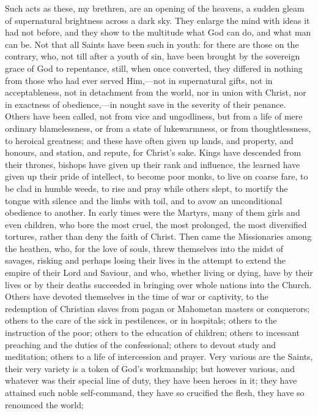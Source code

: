 Such acts as these, my brethren, are an opening of the heavens, a
sudden gleam of supernatural brightness across a dark sky. They
enlarge the mind with ideas it had not before, and they show to the
multitude what God can do, and what man can be. Not that all Saints
have been such in youth: for there are those on the contrary, who, not
till after a youth of sin, have been brought by the sovereign grace of
God to repentance, still, when once converted, they differed in
nothing from those who had ever served Him,—not in supernatural
gifts, not in acceptableness, not in detachment from the world, nor in
union with Christ, nor in exactness of obedience,—in nought save in
the severity of their penance. Others have been called, not from vice
and ungodliness, but from a life of mere ordinary blamelessness, or
from a state of lukewarmness, or from thoughtlessness, to heroical
greatness; and these have often given up lands, and property, and
honours, and station, and repute, for Christ's sake. Kings have
descended from their thrones, bishops have given up their rank and
influence, the learned have given up their pride of intellect, to
become poor monks, to live on coarse fare, to be clad in humble weeds,
to rise and pray while others slept, to mortify the tongue with
silence and the limbs with toil, and to avow an unconditional
obedience to another. In early times were the Martyrs, many of them
girls and even children, who bore the most cruel, the most prolonged,
the most diversified tortures, rather than deny the faith of Christ.
Then came the Missionaries among the heathen, who, for the love of
souls, threw themselves into the midst of savages, risking and perhaps
losing their lives in the attempt to extend the empire of their Lord
and Saviour, and who, whether living or dying, have by their lives or
by their deaths succeeded in bringing over whole nations into the
Church. Others have devoted themselves in the time of war or
captivity, to the redemption of Christian slaves from pagan or
Mahometan masters or conquerors; others to the care of the sick in
pestilences, or in hospitals; others to the instruction of the poor;
others to the education of children; others to incessant preaching and
the duties of the confessional; others to devout study and meditation;
others to a life of intercession and prayer. Very various are the
Saints, their very variety is a token of God's workmanship; but
however various, and whatever was their special line of duty, they
have been heroes in it; they have attained such noble self-command,
they have so crucified the flesh, they have so renounced the world;
